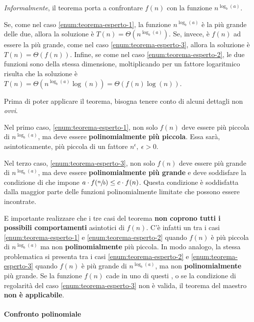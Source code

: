 \documentclass[italian, 10pt]{article}
\begin{document}
\bigskip
\textit{Informalmente}, il teorema porta a confrontare \(f(n)\) con la funzione \(n^{\log_b(a)}\).

Se, come nel caso \ref{enum:teorema-esperto-1}, la funzione \(n^{\log_b(a)}\) è la più grande delle due, allora la soluzione è \(T(n) = \Theta\left(n^{\log_b (a)}\right)\).
Se, invece, è \(f(n)\) ad essere la più grande, come nel caso \ref{enum:teorema-esperto-3}, allora la soluzione è \(T(n) = \Theta\left(f(n)\right)\).
Infine, se come nel caso \ref{enum:teorema-esperto-2}, le due funzioni sono della stessa dimensione, moltiplicando per un fattore logaritmico risulta che la soluzione è \(T(n) = \Theta\left(n^{\log_b(a)} \log{(n)}\right) = \Theta\left(f(n) \log{(n)}\right)\).

\bigskip
Prima di poter applicare il teorema, bisogna tenere conto di alcuni dettagli non \textit{ovvi}.

Nel primo caso, \ref{enum:teorema-esperto-1}, non solo \(f(n)\) deve essere più piccola di \(n^{\log_b(a)}\), ma deve essere \textbf{polinomialmente più piccola}.
Essa sarà, asintoticamente, più piccola di un fattore \(n^\epsilon,\ \epsilon>0\).

Nel terzo caso, \ref{enum:teorema-esperto-3}, non solo \(f(n)\) deve essere più grande di \(n^{\log_b(a)}\), ma deve essere \textbf{polinomialmente più grande} e deve soddisfare la condizione di  che impone \(a \cdot f(\sfrac{n}{b}) \leq c \cdot f(n)\).
Questa condizione è soddisfatta dalla maggior parte delle funzioni polinomialmente limitate che possono essere incontrate.

\bigskip
E importante realizzare che i tre casi del teorema \textbf{non coprono tutti i possibili comportamenti} asintotici di \(f(n)\).
C'è infatti un  tra i casi \ref{enum:teorema-esperto-1} e \ref{enum:teorema-esperto-2} quando \(f(n)\) è più piccola di \(n^{\log_b(a)}\) ma non \textbf{polinomialmente} più piccola.
In modo analogo, la stessa problematica si presenta tra i casi \ref{enum:teorema-esperto-2} e \ref{enum:teorema-esperto-3} quando \(f(n)\) è più grande di \(n^{\log_b(a)}\), ma non \textbf{polinomialmente} più grande.
Se la funzione \(f(n)\) cade in uno di questi , o se la condizione di regolarità del caso \ref{enum:teorema-esperto-3} non è valida, il teorema del maestro \textbf{non è applicabile}.

\paragraph{Confronto polinomiale}
\end{document}
